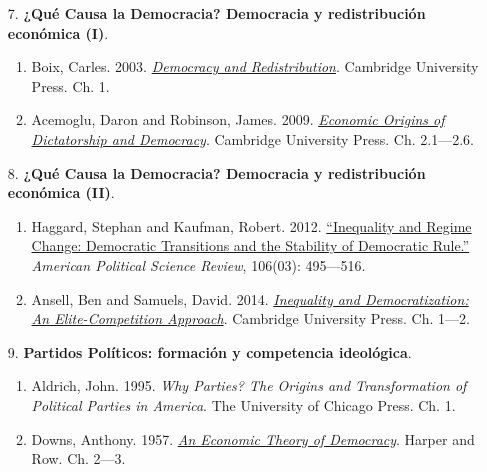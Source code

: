 \documentclass[letterpaper]{article}
\begin{document}
\begin{enumerate}
\begin{enumerate}
				\item[7.] {\bf ¿Qu\'e Causa la Democracia? Democracia y redistribuci\'on econ\'omica (I)}.  
					\begin{enumerate}
						\item Boix, Carles. 2003. \href{https://github.com/hbahamonde/Ciencia_Politica_I/raw/master/Readings/Boix_2003.pdf}{\emph{Democracy and Redistribution}}. Cambridge University Press. Ch. 1.

						\item Acemoglu, Daron and Robinson, James. 2009. \href{https://github.com/hbahamonde/Ciencia_Politica_I/raw/master/Readings/Acemoglu_Robinson.pdf}{\emph{Economic Origins of Dictatorship and Democracy}}. Cambridge University Press. Ch. 2.1---2.6.
					\end{enumerate}


				\item[8.] {\bf ¿Qu\'e Causa la Democracia? Democracia y redistribuci\'on econ\'omica (II)}.  
					\begin{enumerate}
						\item Haggard, Stephan and Kaufman, Robert. 2012. \href{https://github.com/hbahamonde/Ciencia_Politica_I/raw/master/Readings/Haggard_Kaufman.pdf}{``Inequality and Regime Change: Democratic Transitions and the Stability of Democratic Rule.''} \emph{American Political Science Review}, 106(03): 495---516.

						\item Ansell, Ben and Samuels, David. 2014. \href{https://github.com/hbahamonde/Ciencia_Politica_I/raw/master/Readings/Ansell_Samuels.pdf}{\emph{Inequality and Democratization: An Elite-Competition Approach}}. Cambridge University Press. Ch. 1---2.
					\end{enumerate}

				\item[9.] {\bf Partidos Pol\'iticos: formaci\'on y competencia ideol\'ogica}.
					\begin{enumerate}
						\item Aldrich, John. 1995. \emph{Why Parties? The Origins and Transformation of Political Parties in America}. The University of Chicago Press. Ch. 1.
						
						\item Downs, Anthony. 1957. \href{https://github.com/hbahamonde/Ciencia_Politica_I/raw/master/Readings/Downs.pdf}{\emph{An Economic Theory of Democracy}}. Harper and Row. Ch. 2---3.
					\end{enumerate}
			

\end{enumerate}
\end{enumerate}
\end{document}

